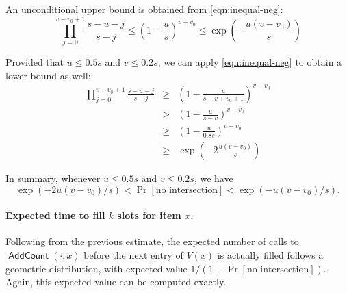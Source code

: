 \documentclass[letterpaper,12pt]{article}
\DeclareMathOperator{\AddCount}{\textsf{AddCount}}
\begin{document}
An unconditional upper bound is obtained from \eqref{eqn:inequal-neg}:
\[ \prod_{j=0}^{v-v_0+1} \frac{s-u-j}{s-j}
  \le \left(1 - \frac{u}{s}\right)^{v-v_0}
  \le \exp\left(-\frac{u(v-v_0)}{s}\right)
\]


Provided that $u \le 0.5s$ and $v \le 0.2s$,
we can apply \eqref{eqn:inequal-neg} to obtain a lower bound as
well:
\begin{eqnarray*}
  \prod_{j=0}^{v-v_0+1} \frac{s-u-j}{s-j}
    &\ge& \left(1 - \frac{u}{s-v+v_0+1}\right)^{v-v_0} \\
    &>& \left(1 - \frac{u}{s-v}\right)^{v-v_0} \\
    &\ge& \left(1 - \frac{u}{0.8 s}\right)^{v-v_0} \\
    &\ge& \exp\left(-2 \frac{u(v-v_0)}{s}\right)
\end{eqnarray*}

In summary, whenever $u\le 0.5s$ and $v \le 0.2s$, we have
\begin{equation}\label{eqn:prob-no-inter}
  \exp(-2u(v-v_0)/s) < \Pr[\text{no intersection}] < \exp(-u(v-v_0)/s).
\end{equation}

\paragraph{Expected time to fill $k$ slots for item $x$.}

Following from the previous estimate,
the expected number of calls to $\AddCount(\cdot,x)$ before the next
entry of $V(x)$ is actually filled follows a geometric distribution,
with expected value $1/(1 - \Pr[\text{no intersection}])$. Again, this
expected value can be computed exactly.
\end{document}
